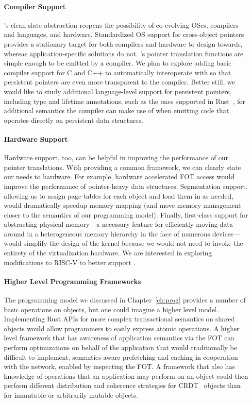\paragraph{Compiler Support}
\Twizzler's clean-slate \NVM abstraction reopens the possibility of co-evolving OSes, compilers and
languages, and hardware.
Standardized OS support for cross-object pointers provides a stationary target for both
compilers and hardware to design towards, whereas application-specific solutions do not.
\Twizzler's pointer translation functions are simple enough to be emitted by a compiler. We plan
to explore adding basic compiler support for C and C++ to automatically interoperate with
\Twizzler so that persistent pointers are even more transparent to the compiler. Better still,
we would like to study additional language-level support for persistent pointers, including type
and lifetime annotations, such as the ones supported in Rust~\cite{rust}, for additional semantics the
compiler can make use of when emitting code that operates directly on persistent data
structures.

\paragraph{Hardware Support}
Hardware support, too, can be helpful in improving the performance of our pointer translations.
With \Twizzler providing a common framework, we can clearly state our needs to hardware. For
example, hardware accelerated FOT access would improve the performance of pointer-heavy data
structures. Segmentation support, allowing us to assign page-tables for each object and load
them in as needed, would dramatically speedup memory mapping (and move memory management closer
to the semantics of our programming model). Finally, first-class support for abstracting
physical memory---a necessary feature for efficiently moving data around in a heterogeneous
memory hierarchy in the face of numerous devices---would simplify the design of the kernel
because we would not need to invoke the entirety of the virtualization hardware. We are
interested in exploring modifications to RISC-V to better support \Twizzler.

\paragraph{Higher Level Programming Frameworks}

The programming model we discussed in Chapter~\ref{ch:prog} provides a number of basic operations on objects, but one
could imagine a higher level model. Implementing Rust APIs for more complex transactional semantics on shared objects
would allow programmers to easily express atomic operations. A higher level framework that has awareness of application
semantics via the FOT can perform optimizations on behalf of the application that would traditionally be difficult to
implement, \eg semantics-aware prefetching and caching in cooperation with the network, enabled by inspecting the FOT. A
framework that also has knowledge of operations that an application may perform on an object could then perform
different distribution and coherence strategies for CRDT~\cite{shapiro2011comprehensive} objects than for immutable or
arbitrarily-mutable objects.

